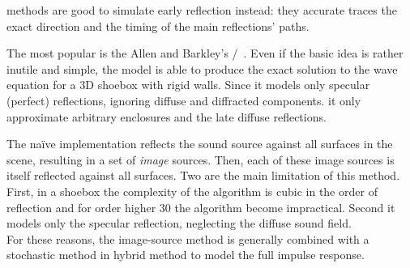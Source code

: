  methods are good to simulate early reflection instead:
they accurate traces the exact direction and the timing of the main reflections' paths.

The most popular is the Allen and Barkley's \ISMdef/~\cite{allen1979image}.
Even if the basic idea is rather inutile and simple, the model is able to produce the exact solution to the wave equation for a 3D shoebox with rigid walls.
Since it models only specular (perfect) reflections, ignoring diffuse and diffracted components.
it only approximate arbitrary enclosures and the late diffuse reflections.

The na\"ive implementation reflects the sound source against all surfaces in the scene, resulting in a set of \textit{image} sources.
Then, each of these image sources is itself reflected against all surfaces.
Two are the main limitation of this method.
First, in a shoebox the complexity of the algorithm is cubic in the order of reflection and for order higher 30 the algorithm become impractical.
Second it models only the specular reflection, neglecting the diffuse sound field.
\\For these reasons, the image-source method is generally combined with a stochastic method in hybrid method to model the full impulse response.


